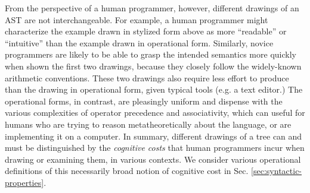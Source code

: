 From the perspective of a human programmer, however, different drawings of an AST are not interchangeable. For example, a human programmer might characterize the example drawn in stylized form above as more ``readable'' or ``intuitive'' than the example drawn in operational form. Similarly, novice programmers are likely to be able to grasp the intended semantics more quickly when shown the first two drawings, because they closely follow the widely-known arithmetic conventions. These two drawings also require less effort to produce than the drawing in operational form, given typical tools (e.g. a text editor.) The operational forms, in contrast, are pleasingly uniform and dispense with the various complexities of operator precedence and associativity, which can useful for humans who are trying to reason metatheoretically about the language, or are implementing it on a computer. %
In summary, different drawings of a tree can and must be distinguished by the \emph{cognitive costs}  that human programmers incur when drawing or examining them, in various contexts. We consider various operational definitions of this necessarily broad notion of cognitive cost in Sec. \ref{sec:syntactic-properties}. %

